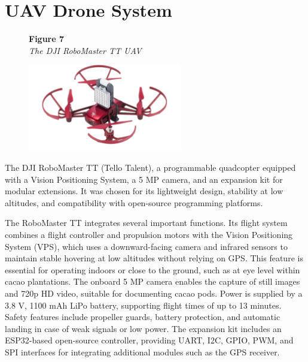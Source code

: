 	\section{UAV Drone System}
	
	\begin{figure}[H]
		\raggedright
		\textbf{Figure 7} \\ %
		\textit{The DJI RoboMaster TT UAV} %
		
		\vspace{0.5em}
		\centering
		\includegraphics[width=0.6\textwidth]{figures/Robomaster_TT.pdf} %
		
		\vspace{0.5em}
		\raggedright
		
		\label{fig:robomaster_tt}
	\end{figure}
	
	The DJI RoboMaster TT (Tello Talent), a programmable quadcopter 
	equipped with a Vision Positioning System, a 5 MP camera, and an expansion kit for modular extensions. 
	It was chosen for its lightweight design, stability at low altitudes, and compatibility with open-source 
	programming platforms. 
	
	The RoboMaster TT integrates several important functions. Its flight system combines a flight controller 
	and propulsion motors with the Vision Positioning System (VPS), which uses a downward-facing camera and 
	infrared sensors to maintain stable hovering at low altitudes without relying on GPS. This feature is 
	essential for operating indoors or close to the ground, such as at eye level within cacao plantations. 
	The onboard 5 MP camera enables the capture of still images and 720p HD video, suitable for documenting 
	cacao pods. Power is supplied by a 3.8 V, 1100 mAh LiPo battery, supporting flight times of up to 
	13 minutes. Safety features include propeller guards, battery protection, and automatic landing in case 
	of weak signals or low power. The expansion kit includes an ESP32-based open-source controller, providing 
	UART, I2C, GPIO, PWM, and SPI interfaces for integrating additional modules such as the GPS receiver.
	
